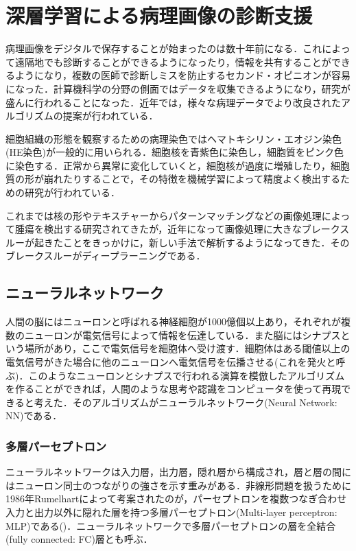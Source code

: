 \chapter{深層学習による病理画像の診断支援}
\label{chap_review}

病理画像をデジタルで保存することが始まったのは数十年前になる．これによって遠隔地でも診断することができるようになったり，情報を共有することができるようになり，複数の医師で診断しミスを防止するセカンド・オピニオンが容易になった．計算機科学の分野の側面ではデータを収集できるようになり，研究が盛んに行われることになった．近年では，様々な病理データでより改良されたアルゴリズムの提案が行われている\cite{litjens2017survey}．

細胞組織の形態を観察するための病理染色ではヘマトキシリン・エオジン染色(HE染色)が一般的に用いられる．細胞核を青紫色に染色し，細胞質をピンク色に染色する．正常から異常に変化していくと，細胞核が過度に増殖したり，細胞質の形が崩れたりすることで，その特徴を機械学習によって精度よく検出するための研究が行われている\cite{wang2016deep}．

これまでは核の形やテキスチャーからパターンマッチングなどの画像処理によって腫瘍を検出する研究されてきたが\cite{要出典}，近年になって画像処理に大きなブレークスルーが起きたことをきっかけに，新しい手法で解析するようになってきた．そのブレークスルーがディープラーニングである．

\section{ニューラルネットワーク}\label{sec:NeuralNetwork}
人間の脳にはニューロンと呼ばれる神経細胞が1000億個以上あり，それぞれが複数のニューロンが電気信号によって情報を伝達している．また脳にはシナプスという場所があり，ここで電気信号を細胞体へ受け渡す．細胞体はある閾値以上の電気信号がきた場合に他のニューロンへ電気信号を伝播させる(これを発火と呼ぶ)．このようなニューロンとシナプスで行われる演算を模倣したアルゴリズムを作ることができれば，人間のような思考や認識をコンピュータを使って再現できると考えた．そのアルゴリズムがニューラルネットワーク(Neural Network: NN)である．

\subsection{多層パーセプトロン}
ニューラルネットワークは入力層，出力層，隠れ層から構成され，層と層の間にはニューロン同士のつながりの強さを示す重みがある．非線形問題を扱うために1986年Rumelhartによって考案されたのが，パーセプトロンを複数つなぎ合わせ入力と出力以外に隠れた層を持つ多層パーセプトロン(Multi-layer perceptron: MLP)である()．ニューラルネットワークで多層パーセプトロンの層を全結合(fully connected: FC)層とも呼ぶ．

